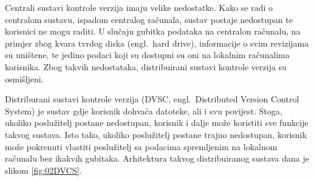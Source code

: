 Centrali sustavi kontrole verzija imaju velike nedostatke. Kako se radi o centralom sustavu, ispadom
centralog računala, sustav postaje nedostupan te korisnici ne mogu raditi. U slučaju gubitka
podataka na centralon računalu, na primjer zbog kvara tvrdog diska (engl.~hard drive), informacije o
svim revizijama su uništene, te jedino podaci koji su dostupni su oni na lokalnim računalima
korisnika. Zbog takvih nedostataka, distribuirani sustavi kontrole verzija su osmišljeni.

Distriburani sustavi kontrole verzija (DVSC, engl.~Distributed Version Control System) je sustav
gdje korisnik dohvaća datoteke, ali i svu povijest. Stoga, ukoliko poslužitelj postane nedostupan,
korisnik i dalje može koristiti sve funkcije takvog sustava. Isto tako, ukoliko poslužitelj postane
trajno nedostupan, korisnik može pokrenuti vlastiti poslužitelj sa podacima spremljenim na lokalnom
računalu bez ikakvih gubitaka. Arhitektura takvog distribuiranog sustava dana je slikom
\ref{fig:02DVCS}.

